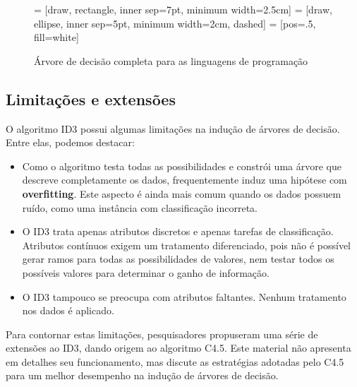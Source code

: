 \begin{figure}[h]
	\centering
	 = [draw, rectangle, inner sep=7pt, minimum width=2.5cm]
	 = [draw, ellipse, inner sep=5pt, minimum width=2cm, dashed]
	 = [pos=.5, fill=white]
	
	
	\caption{Árvore de decisão completa para as linguagens de programação}
	\label{fig:arvore-parcial-linguagens-programacao-completa}
\end{figure}

\subsection{Limitações e extensões}

O algoritmo ID3 possui algumas limitações na indução de árvores de decisão. Entre elas, podemos destacar:
\begin{itemize}
	\item Como o algoritmo testa todas as possibilidades e constrói uma árvore que descreve completamente os dados, frequentemente induz uma hipótese com \textbf{overfitting}. Este aspecto é ainda mais comum quando os dados possuem ruído, como uma instância com classificação incorreta.
	
	\item O ID3 trata apenas atributos discretos e apenas tarefas de classificação. Atributos contínuos exigem um tratamento diferenciado, pois não é possível gerar ramos para todas as possibilidades de valores, nem testar todos os possíveis valores para determinar o ganho de informação.
	
	\item O ID3 tampouco se preocupa com atributos faltantes. Nenhum tratamento nos dados é aplicado.
\end{itemize}

Para contornar estas limitações, pesquisadores propuseram uma série de extensões ao ID3, dando origem ao algoritmo C4.5. Este material não apresenta em detalhes seu funcionamento, mas discute as estratégias adotadas pelo C4.5 para um melhor desempenho na indução de árvores de decisão.

